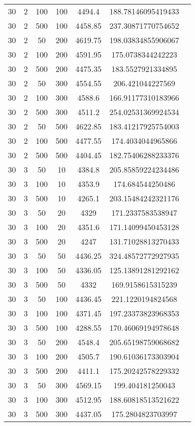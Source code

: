 {\begin{longtabu}{S
S
S
S
S
S[round-mode=places,round-precision=0]
S[round-mode=places,round-precision=0]}
30 & 2 & 100 & 100 & 4494.4 & 188.78146095419433 \\
30 & 2 & 500 & 100 & 4458.85 & 237.30871770754652 \\
30 & 2 & 50 & 200 & 4619.75 & 198.03834855906067 \\
30 & 2 & 100 & 200 & 4591.95 & 175.0738344242223 \\
30 & 2 & 500 & 200 & 4475.35 & 183.5527921334895 \\
30 & 2 & 50 & 300 & 4554.55 & 206.421044227569 \\
30 & 2 & 100 & 300 & 4588.6 & 166.91177310183966 \\
30 & 2 & 500 & 300 & 4511.2 & 254.02531369924534 \\
30 & 2 & 50 & 500 & 4622.85 & 183.41217925754003 \\
30 & 2 & 100 & 500 & 4477.55 & 174.4034044965866 \\
30 & 2 & 500 & 500 & 4404.45 & 182.75406288233376 \\
30 & 3 & 50 & 10 & 4384.8 & 205.85859224234486 \\
30 & 3 & 100 & 10 & 4353.9 & 174.684544250486 \\
30 & 3 & 500 & 10 & 4265.1 & 203.15484242321176 \\
30 & 3 & 50 & 20 & 4329 & 171.2337583538947 \\
30 & 3 & 100 & 20 & 4351.6 & 171.14099450453128 \\
30 & 3 & 500 & 20 & 4247 & 131.71028813270433 \\
30 & 3 & 50 & 50 & 4436.25 & 324.48572772927935 \\
30 & 3 & 100 & 50 & 4336.05 & 125.13891281292162 \\
30 & 3 & 500 & 50 & 4332 & 169.9158615315239 \\
30 & 3 & 50 & 100 & 4436.45 & 221.1220194824568 \\
30 & 3 & 100 & 100 & 4371.45 & 197.23373823968353 \\
30 & 3 & 500 & 100 & 4288.55 & 170.46069194978648 \\
30 & 3 & 50 & 200 & 4548.4 & 205.65198759068682 \\
30 & 3 & 100 & 200 & 4505.7 & 190.61036173303904 \\
30 & 3 & 500 & 200 & 4411.1 & 175.20242578229332 \\
30 & 3 & 50 & 300 & 4569.15 & 199.404181250043 \\
30 & 3 & 100 & 300 & 4512.95 & 188.60818513521622 \\
30 & 3 & 500 & 300 & 4437.05 & 175.2804823703997 \\

\end{longtabu}}
